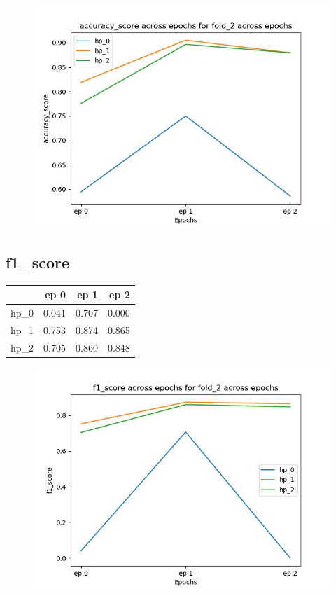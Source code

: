\documentclass{article}
\begin{document}
\begin{figure}[H]
\includegraphics[scale = 0.75]{fold_2/accuracy_score}
\end{figure}
\subsection{f1\_score}
\begin{tabular}{lrrr}
\toprule
{} &   ep 0 &   ep 1 &   ep 2 \\
\midrule
hp\_0 &  0.041 &  0.707 &  0.000 \\
hp\_1 &  0.753 &  0.874 &  0.865 \\
hp\_2 &  0.705 &  0.860 &  0.848 \\
\bottomrule
\end{tabular}

\begin{figure}[H]
\includegraphics[scale = 0.75]{fold_2/f1_score}
\end{figure}
\end{document}
